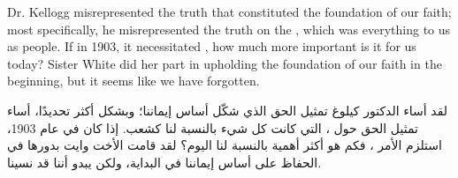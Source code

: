 Dr. Kellogg misrepresented the truth that constituted the foundation of our faith; most specifically, he misrepresented the truth on the , which was everything to us as people. If in 1903, it necessitated , how much more important is it for us today? Sister White did her part in upholding the foundation of our faith in the beginning, but it seems like we have forgotten.


لقد أساء الدكتور كيلوغ تمثيل الحق الذي شكّل أساس إيماننا؛ وبشكل أكثر تحديدًا، أساء تمثيل الحق حول ، التي كانت كل شيء بالنسبة لنا كشعب. إذا كان في عام 1903، استلزم الأمر ، فكم هو أكثر أهمية بالنسبة لنا اليوم؟ لقد قامت الأخت وايت بدورها في الحفاظ على أساس إيماننا في البداية، ولكن يبدو أننا قد نسينا.



